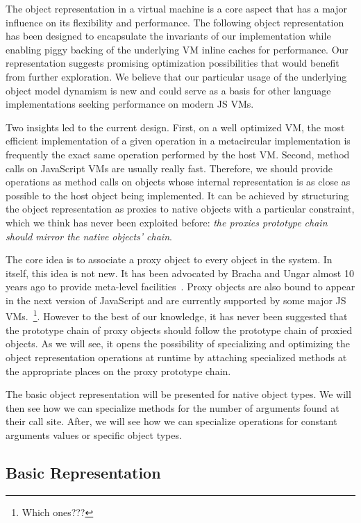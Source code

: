 The object representation in a virtual machine is a core aspect that has a
major influence on its flexibility and performance. The following object
representation has been designed to encapsulate the invariants of our
implementation while enabling piggy backing of the underlying VM inline
caches for performance. Our representation suggests promising optimization
possibilities that would benefit from further exploration. We believe that our
particular usage of the underlying object model dynamism is new and could serve
as a basis for other language implementations seeking performance on modern JS
VMs.

Two insights led to the current design. First, on a well optimized VM, the most
efficient implementation of a given operation in a metacircular implementation
is frequently the exact same operation performed by the host VM. Second, method
calls on JavaScript VMs are usually really fast. Therefore, we should provide
operations as method calls on objects whose internal representation is as close
as possible to the host object being implemented. It can be achieved by
structuring the object representation as proxies to native objects with a
particular constraint, which we think has never been exploited before:
\textit{the proxies prototype chain should mirror the native objects' chain}.

The core idea is to associate a proxy object to every object in the system. In
itself, this idea is not new. It has been advocated by Bracha and Ungar almost
10 years ago to provide meta-level facilities~\cite{Bracha:2004vp}. Proxy
objects are also bound to appear in the next version of JavaScript and are
currently supported by some major JS VMs.~\footnote{Which ones???}. However to
the best of our knowledge, it has never been suggested that the prototype chain
of proxy objects should follow the prototype chain of proxied objects. As we
will see, it opens the possibility of specializing and optimizing the object
representation operations at runtime by attaching specialized methods at the
appropriate places on the proxy prototype chain.

The basic object representation will be presented for native object types. We
will then see how we can specialize methods for the number of arguments found
at their call site.  After, we will see how we can specialize operations for
constant arguments values or specific object types.

\subsection{Basic Representation}

